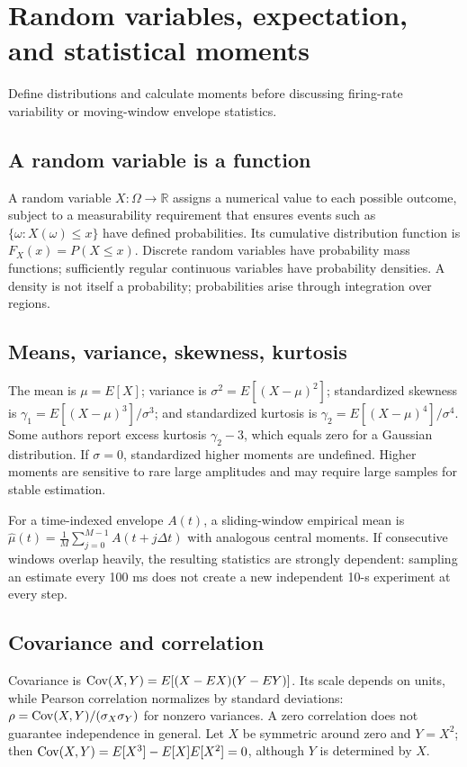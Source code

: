 \chapter{Random variables, expectation, and statistical moments}\label{ch:moments}
\begin{readergoal}Define distributions and calculate moments before discussing firing-rate variability or moving-window envelope statistics.\end{readergoal}
\section{A random variable is a function}
A random variable $X:\Omega\to\mathbb R$ assigns a numerical value to each possible outcome, subject to a measurability requirement that ensures events such as $\{\omega:X(\omega)\le x\}$ have defined probabilities. Its cumulative distribution function is $F_X(x)=P(X\le x)$. Discrete random variables have probability mass functions; sufficiently regular continuous variables have probability densities. A density is not itself a probability; probabilities arise through integration over regions.

\section{Means, variance, skewness, kurtosis}
The mean is $\mu=E[X]$; variance is $\sigma^2=E[(X-\mu)^2]$; standardized skewness is $\gamma_1=E[(X-\mu)^3]/\sigma^3$; and standardized kurtosis is $\gamma_2=E[(X-\mu)^4]/\sigma^4$. Some authors report excess kurtosis $\gamma_2-3$, which equals zero for a Gaussian distribution. If $\sigma=0$, standardized higher moments are undefined. Higher moments are sensitive to rare large amplitudes and may require large samples for stable estimation.

For a time-indexed envelope $A(t)$, a sliding-window empirical mean is $\hat\mu(t)=\frac1{M}\sum_{j=0}^{M-1}A(t+j\Delta t)$ with analogous central moments. If consecutive windows overlap heavily, the resulting statistics are strongly dependent: sampling an estimate every 100 ms does not create a new independent 10-s experiment at every step.

\section{Covariance and correlation}
Covariance is $\operatorname{Cov}(X,Y)=E[(X-EX)(Y-EY)]$. Its scale depends on units, while Pearson correlation normalizes by standard deviations: $\rho=\operatorname{Cov}(X,Y)/(\sigma_X\sigma_Y)$ for nonzero variances. A zero correlation does not guarantee independence in general. Let $X$ be symmetric around zero and $Y=X^2$; then $\operatorname{Cov}(X,Y)=E[X^3]-E[X]E[X^2]=0$, although $Y$ is determined by $X$.

